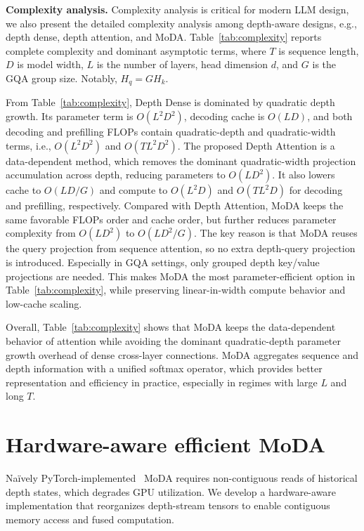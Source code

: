 \documentclass[]{bytedance_seed}
\newcommand{\myPara}[1]{\vspace{.05in}\noindent\textbf{#1.}}
\newcommand{\name}{MoDA}
\begin{document}
\myPara{Complexity analysis}
Complexity analysis is critical for modern LLM design, we also present the detailed complexity analysis among depth-aware designs, e.g., depth dense, depth attention, and \name{}.
Table~\ref{tab:complexity} reports complete complexity and dominant asymptotic terms, where $T$ is sequence length, $D$ is model width, $L$ is the number of layers, head dimension $d$, and $G$ is the GQA group size. Notably, $H_q = G H_k$.

From Table~\ref{tab:complexity}, Depth Dense is dominated by quadratic depth growth. 
Its parameter term is $O(L^2D^2)$, decoding cache is $O(LD)$, and both decoding and prefilling FLOPs contain quadratic-depth and quadratic-width terms, i.e., $O(L^2D^2)$ and $O(TL^2D^2)$.
The proposed Depth Attention is a data-dependent method, which removes the dominant quadratic-width projection accumulation across depth, reducing parameters to $O(LD^2)$.
It also lowers cache to $O(LD/G)$ and compute to $O(L^2D)$ and $O(TL^2D)$ for decoding and prefilling, respectively.
Compared with Depth Attention, \name{} keeps the same favorable FLOPs order and cache order, but further reduces parameter complexity from $O(LD^2)$ to $O(LD^2/G)$.
The key reason is that \name{} reuses the query projection from sequence attention, so no extra depth-query projection is introduced.
Especially in GQA settings, only grouped depth key/value projections are needed.
This makes \name{} the most parameter-efficient option in Table~\ref{tab:complexity}, while preserving linear-in-width compute behavior and low-cache scaling.

Overall, Table~\ref{tab:complexity} shows that \name{} keeps the data-dependent behavior of attention while avoiding the dominant quadratic-depth parameter growth overhead of dense cross-layer connections.
\name{} aggregates sequence and depth information with a unified softmax operator, which provides better representation and efficiency in practice, especially in regimes with large $L$ and long $T$.

\section{Hardware-aware efficient \name}
\label{sec:hardware_efficient}
Na\"ively PyTorch-implemented~\cite{paszke2019pytorch} \name{} requires non-contiguous reads of historical depth states, which degrades GPU utilization.
We develop a hardware-aware implementation that reorganizes depth-stream tensors to enable contiguous memory access and fused computation.
\end{document}
